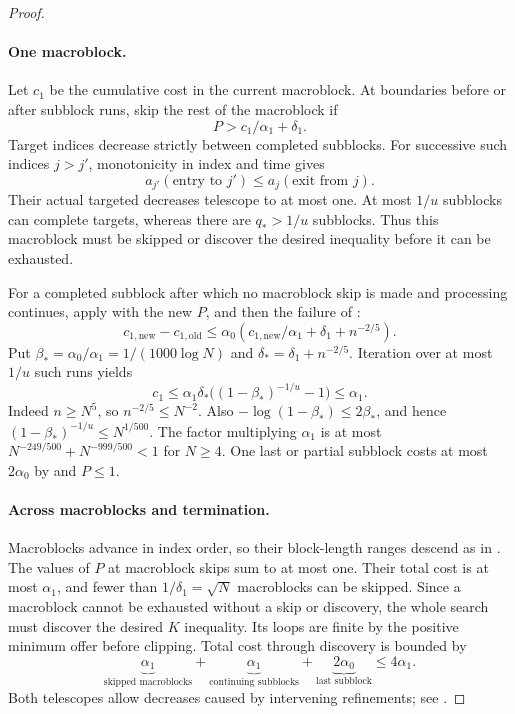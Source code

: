 \begin{proof}
\paragraph{One macroblock.}
Let $c_1$ be the cumulative cost in the current macroblock.
At boundaries before or after subblock runs, skip the rest of the macroblock if
\begin{equation}
 P>c_1/\alpha_1+\delta_1.
 \label{entropy-refinement:macro-skip}
\end{equation}
Target indices decrease strictly between completed subblocks. For successive
such indices $j>j'$, monotonicity in index and time gives
\begin{equation}
 a_{j'}(\text{entry to }j')\le a_j(\text{exit from }j).
 \label{entropy-refinement:target-telescope}
\end{equation}
Their actual targeted decreases telescope to at most one. At most $1/u$
subblocks can complete targets, whereas there are $q_*>1/u$ subblocks.
Thus this macroblock must be skipped or discover the desired inequality
before it can be exhausted.

For a completed subblock after which no macroblock skip is made and processing
continues, apply  with the new $P$,
and then the failure of :
\[
 c_{1,\mathrm{new}}-c_{1,\mathrm{old}}
 \le\alpha_0(c_{1,\mathrm{new}}/\alpha_1+\delta_1+n^{-2/5}).
\]
Put $\beta_*=\alpha_0/\alpha_1=1/(1000\log N)$ and
$\delta_*=\delta_1+n^{-2/5}$. Iteration over at most $1/u$ such runs yields
\begin{equation}
 c_1\le\alpha_1\delta_*\bigl((1-\beta_*)^{-1/u}-1\bigr)\le\alpha_1.
 \label{entropy-refinement:macro-cost}
\end{equation}
Indeed $n\ge N^5$, so $n^{-2/5}\le N^{-2}$. Also
$-\log(1-\beta_*)\le2\beta_*$, and hence
$(1-\beta_*)^{-1/u}\le N^{1/500}$. The factor multiplying $\alpha_1$ is
at most $N^{-249/500}+N^{-999/500}<1$ for $N\ge4$.
One last or partial subblock costs at most $2\alpha_0$ by
 and $P\le1$.

\paragraph{Across macroblocks and termination.}
Macroblocks advance in index order, so their block-length ranges descend as in
. The values of $P$ at macroblock
skips sum to at most one. Their total cost is at most $\alpha_1$, and fewer
than $1/\delta_1=\sqrt N$ macroblocks can be skipped.
Since a macroblock cannot be exhausted without a skip or discovery, the
whole search must discover the desired $K$ inequality. Its loops are finite
by the positive minimum offer before clipping. Total cost through discovery
is bounded by
\[
 \underbrace{\alpha_1}_{\text{skipped macroblocks}}
 +\underbrace{\alpha_1}_{\text{continuing subblocks}}
 +\underbrace{2\alpha_0}_{\text{last subblock}}\le4\alpha_1.
\]
Both telescopes allow decreases caused by intervening refinements;
see .


\end{proof}
